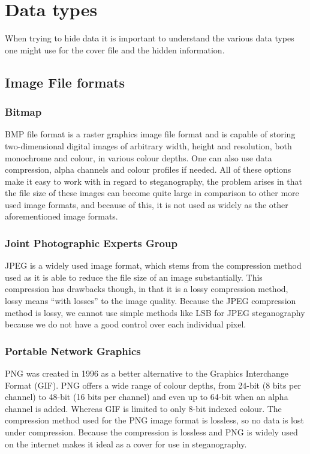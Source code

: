 \section{Data types}
When trying to hide data it is important to understand the various data types one might use for the cover file and the hidden information.

\subsection{Image File formats}


\subsubsection*{Bitmap}
BMP file format is a raster graphics image file format and is capable of storing two-dimensional digital images of arbitrary width, height and resolution, both monochrome and colour, in various colour depths. 
One can also use data compression, alpha channels and colour profiles if needed.
All of these options make it easy to work with in regard to steganography, the problem arises in that the file size of these images can become quite large in comparison to other more used image formats, and because of this, it is not used as widely as the other aforementioned image formats.

\subsubsection*{Joint Photographic Experts Group}
JPEG is a widely used image format, which stems from the compression method used as it is able to reduce the file size of an image substantially.
This compression has drawbacks though, in that it is a lossy compression method, lossy means ``with losses'' to the image quality.
Because the JPEG compression method is lossy, we cannot use simple methods like LSB for JPEG steganography because we do not have a good control over each individual pixel.


\subsubsection*{Portable Network Graphics}
PNG was created in 1996 as a better alternative to the Graphics Interchange Format (GIF).
PNG offers a wide range of colour depths, from 24-bit (8 bits per channel) to 48-bit (16 bits per channel) and even up to 64-bit when an alpha channel is added.
Whereas GIF is limited to only 8-bit indexed colour.
The compression method used for the PNG image format is lossless, so no data is lost under compression.
Because the compression is lossless and PNG is widely used on the internet makes it ideal as a cover for use in steganography.



